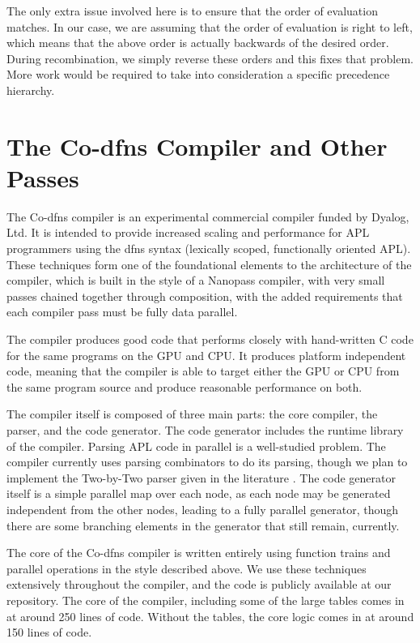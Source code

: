 ﻿\documentclass[numbers,10pt,preprint]{sigplanconf}
\begin{document}
The only extra issue involved here is to ensure that the order of evaluation matches. In our case, we are assuming that the order of evaluation is right to left, which means that the above order is actually backwards of the desired order. During recombination, we simply reverse these orders and this fixes that problem. More work would be required to take into consideration a specific precedence hierarchy.

\section{The Co-dfns Compiler and Other Passes}

The Co-dfns compiler is an experimental commercial compiler funded by Dyalog, Ltd. \cite{hsu2014co,hsu2015accelerating} It is intended to provide increased scaling and performance for APL programmers using the dfns syntax (lexically scoped, functionally oriented APL). These techniques form one of the foundational elements to the architecture of the compiler, which is built in the style of a Nanopass \cite{keep2013nanopass} compiler, with very small passes chained together through composition, with the added requirements that each compiler pass must be fully data parallel.

The compiler produces good code that performs closely with hand-written C code for the same programs on the GPU and CPU. It produces platform independent code, meaning that the compiler is able to target either the GPU or CPU from the same program source and produce reasonable performance on both.

The compiler itself is composed of three main parts: the core compiler, the parser, and the code generator. The code generator includes the runtime library of the compiler. Parsing APL code in parallel is a well-studied problem. The compiler currently uses parsing combinators to do its parsing, though we plan to implement the Two-by-Two parser given in the literature \cite{bunda1984apl}. The code generator itself is a simple parallel map over each node, as each node may be generated independent from the other nodes, leading to a fully parallel generator, though there are some branching elements in the generator that still remain, currently.

The core of the Co-dfns compiler is written entirely using function trains and parallel operations in the style described above. We use these techniques extensively throughout the compiler, and the code is publicly available at our repository. The core of the compiler, including some of the large tables comes in at around 250 lines of code. Without the tables, the core logic comes in at around 150 lines of code.
\end{document}
